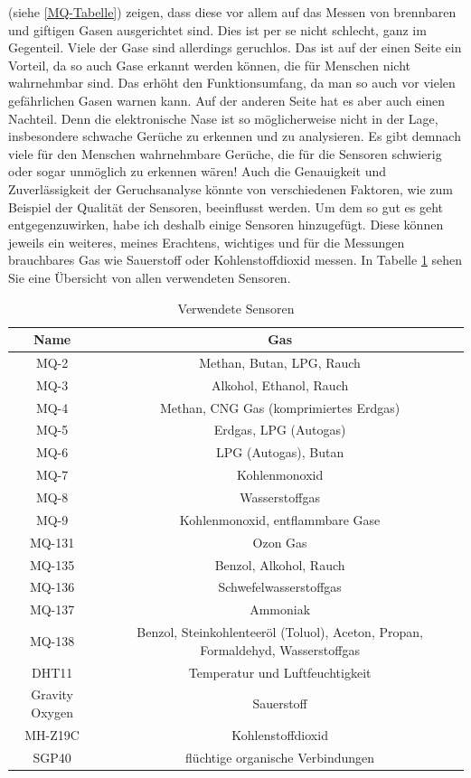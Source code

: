 \documentclass[10pt]{article}
\begin{document}
(siehe \ref{MQ-Tabelle}) zeigen, dass diese vor allem auf das Messen von brennbaren und giftigen Gasen ausgerichtet sind.
Dies ist per se nicht schlecht, ganz im Gegenteil. Viele der Gase sind allerdings geruchlos. Das ist auf der einen Seite ein Vorteil, da so auch Gase erkannt werden
können, die für Menschen nicht wahrnehmbar sind. Das erhöht den Funktionsumfang, da man so auch vor vielen gefährlichen Gasen warnen kann. Auf der anderen Seite 
hat es aber auch einen Nachteil. Denn die elektronische Nase ist so möglicherweise nicht in der Lage,
insbesondere schwache Gerüche zu erkennen und zu analysieren. Es gibt demnach viele für den Menschen wahrnehmbare Gerüche,
die für die Sensoren schwierig oder sogar unmöglich zu erkennen wären! Auch die Genauigkeit und Zuverlässigkeit der Geruchsanalyse 
könnte von verschiedenen Faktoren, wie zum Beispiel der Qualität der Sensoren, beeinflusst werden.
Um dem so gut es geht entgegenzuwirken, habe ich deshalb einige Sensoren hinzugefügt. 
Diese können jeweils ein weiteres, meines Erachtens, wichtiges und für die Messungen brauchbares Gas wie Sauerstoff oder Kohlenstoffdioxid messen.
In Tabelle \ref{Verwendete Sensoren} sehen Sie eine Übersicht von allen verwendeten Sensoren.

\begin{table}[H]
\centering
{}
\begin{tabular}{cc}
Name & Gas \\
\hline
MQ-2 & Methan, Butan, LPG, Rauch\\
MQ-3 & Alkohol, Ethanol, Rauch\\
MQ-4 & Methan, CNG Gas (komprimiertes Erdgas)\\
MQ-5 & Erdgas, LPG (Autogas)\\
MQ-6 & LPG (Autogas), Butan\\
MQ-7 & Kohlenmonoxid\\
MQ-8 & Wasserstoffgas\\
MQ-9 & Kohlenmonoxid, entflammbare Gase\\
MQ-131 & Ozon Gas\\
MQ-135 & Benzol, Alkohol, Rauch\\
MQ-136 & Schwefelwasserstoffgas\\
MQ-137 &  Ammoniak\\
MQ-138 &  Benzol, Steinkohlenteeröl (Toluol), Aceton, Propan, Formaldehyd, Wasserstoffgas\\
DHT11 & Temperatur und Luftfeuchtigkeit \autocite{DHT11}\\
Gravity Oxygen & Sauerstoff \autocite{O2}\\
MH-Z19C & Kohlenstoffdioxid \autocite{MH-Z19C}\\
SGP40 & flüchtige organische Verbindungen \autocite{SGP40}\\
\end{tabular}
\caption{Verwendete Sensoren}
\label{Verwendete Sensoren}
\end{table}
\end{document}
